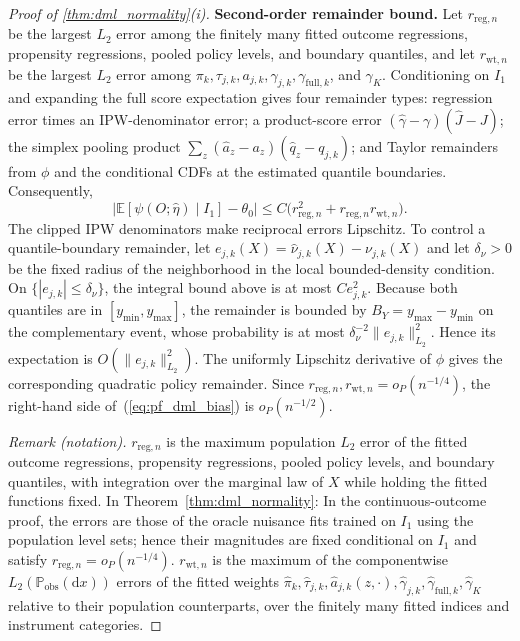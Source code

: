 \begin{proof}[Proof of \cref{thm:dml_normality}\textup{(i)}]
\medskip
\noindent\textbf{Second-order remainder bound.}
Let $r_{\mathrm{reg},n}$ be the largest $L_2$ error among the finitely many fitted outcome regressions, propensity regressions, pooled policy levels, and boundary quantiles, and let $r_{\mathrm{wt},n}$ be the largest $L_2$ error among $\pi_k,\tau_{j,k},a_{j,k},\gamma_{j,k},\gamma_{\mathrm{full},k}$, and $\gamma_K$. Conditioning on $I_1$ and expanding the full score expectation gives four remainder types: regression error times an IPW-denominator error; a product-score error $(\hat\gamma-\gamma)(\hat J-J)$; the simplex pooling product $\sum_z(\hat a_z-a_z)(\hat q_z-q_{j,k})$; and Taylor remainders from $\phi$ and the conditional CDFs at the estimated quantile boundaries. Consequently,
\begin{equation}\label{eq:pf_dml_bias}
    \big|\mathbb{E}[\psi(O;\hat{\eta})\mid I_1] - \theta_0\big|
    \leqslant C\bigl(r_{\mathrm{reg},n}^2+r_{\mathrm{reg},n}r_{\mathrm{wt},n}\bigr).
\end{equation}
The clipped IPW denominators make reciprocal errors Lipschitz. To control a quantile-boundary remainder, let $e_{j,k}(X)=\hat\nu_{j,k}(X)-\nu_{j,k}(X)$ and let $\delta_\nu>0$ be the fixed radius of the neighborhood in the local bounded-density condition. On $\{|e_{j,k}|\leqslant\delta_\nu\}$, the integral bound above is at most $C e_{j,k}^2$. Because both quantiles are in $[y_{\min},y_{\max}]$, the remainder is bounded by $B_Y=y_{\max}-y_{\min}$ on the complementary event, whose probability is at most $\delta_\nu^{-2}\|e_{j,k}\|_{L_2}^2$. Hence its expectation is $O(\|e_{j,k}\|_{L_2}^2)$. The uniformly Lipschitz derivative of $\phi$ gives the corresponding quadratic policy remainder. Since $r_{\mathrm{reg},n},r_{\mathrm{wt},n}=o_P(n^{-1/4})$, the right-hand side of~(\ref{eq:pf_dml_bias}) is $o_P(n^{-1/2})$.

\noindent\textit{Remark (notation).} $r_{\mathrm{reg},n}$ is the maximum population $L_2$ error of the fitted outcome regressions, propensity regressions, pooled policy levels, and boundary quantiles, with integration over the marginal law of $X$ while holding the fitted functions fixed. In Theorem~\ref{thm:dml_normality}: In the continuous-outcome proof, the errors are those of the oracle nuisance fits trained on $I_1$ using the population level sets; hence their magnitudes are fixed conditional on $I_1$ and satisfy $r_{\mathrm{reg},n}=o_P(n^{-1/4})$. $r_{\mathrm{wt},n}$ is the maximum of the componentwise $L_2(\mathbb P_{\mathrm{obs}}(\mathrm{d}x))$ errors of the fitted weights $\hat\pi_k,\hat\tau_{j,k},\hat a_{j,k}(z,\cdot),\hat\gamma_{j,k},\hat\gamma_{\mathrm{full},k},\hat\gamma_K$ relative to their population counterparts, over the finitely many fitted indices and instrument categories.



\end{proof}
